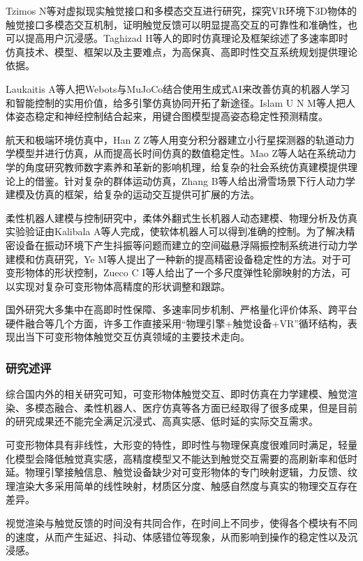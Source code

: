 Tzimos N等对虚拟现实触觉接口和多模态交互进行研究，探究VR环境下3D物体的触觉接口多模态交互机制，证明触觉反馈可以明显提高交互的可靠性和准确性，也可以提高用户沉浸感\cite{tzimos2025}。Taghizad H等人的即时仿真理论及框架综述了多速率即时仿真技术、模型、框架以及主要难点，为高保真、高即时性交互系统规划提供理论依据\cite{taghizad2026}。

Laukaitis A等人把Webots与MuJoCo结合使用生成式AI来改善仿真的机器人学习和智能控制的实用价值，给多引擎仿真协同开拓了新途径\cite{laukaitis2025}。Islam U N M等人把人体姿态稳定和神经控制结合起来，用键合图模型提高姿态稳定性预测精度\cite{islam2026}。

航天和极端环境仿真中，Han Z Z等人用变分积分器建立小行星探测器的轨道动力学模型并进行仿真，从而提高长时间仿真的数值稳定性\cite{han2026}。Mao Z等人站在系统动力学的角度研究教师数字素养和革新的影响机理，给复杂的社会系统仿真建模提供理论上的借鉴\cite{mao2026}。针对复杂的群体运动仿真，Zhang B等人给出滑雪场景下行人动力学建模及仿真的框架，给复杂的运动交互提供可扩展的方法\cite{zhang2026}。

柔性机器人建模与控制研究中，柔体外翻式生长机器人动态建模、物理分析及仿真实验验证由Kalibala A等人完成，使软体机器人可以得到准确的控制\cite{kalibala2026}。为了解决精密设备在振动环境下产生抖振等问题而建立的空间磁悬浮隔振控制系统进行动力学建模和仿真研究，Ye M等人提出了一种新的提高精密设备稳定性的方法\cite{ye2026}。对于可变形物体的形状控制，Zueco C I等人给出了一个多尺度弹性轮廓映射的方法，可以实现对复杂可变形物体高精度的形状调整和跟踪\cite{zueco2025}。

国外研究大多集中在高即时性保障、多速率同步机制、严格量化评价体系、跨平台硬件融合等几个方面，许多工作直接采用“物理引擎+触觉设备+VR”循环结构，表现出当下可变形物体触觉交互仿真领域的主要技术走向。

\subsubsection{研究述评}
综合国内外的相关研究可知，可变形物体触觉交互、即时仿真在力学建模、触觉渲染、多模态融合、柔性机器人、医疗仿真等各方面已经取得了很多成果，但是目前的研究成果还不能完全满足沉浸式、高真实感、低时延的实际交互需求。

可变形物体具有非线性，大形变的特性，即时性与物理保真度很难同时满足，轻量化模型会降低触觉真实感，高精度模型又不能达到触觉交互需要的高刷新率和低时延。物理引擎接触信息、触觉设备缺少对可变形物体的专门映射逻辑，力反馈、纹理渲染大多采用简单的线性映射，材质区分度、触感自然度与真实的物理交互存在差异。

视觉渲染与触觉反馈的时间没有共同合作，在时间上不同步，使得各个模块有不同的速度，从而产生延迟、抖动、体感错位等现象，从而影响到操作的稳定性以及沉浸感。

